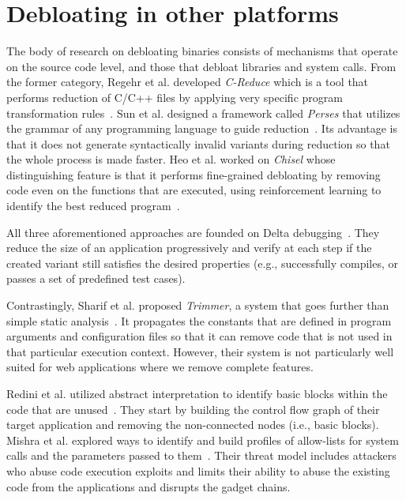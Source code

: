 \section{Debloating in other platforms}

The body of research on debloating binaries consists of mechanisms that operate on the source code level, and those that debloat libraries and system calls. 
From the former category, Regehr et al. developed \textit{C-Reduce} which is a tool that performs reduction of C/C++ files by applying very specific program transformation rules~\cite{regehr2012CReduce}.
Sun et al. designed a framework called \textit{Perses} that utilizes the grammar of any programming language to guide reduction~\cite{sun2018perses}.
Its advantage is that it does not generate syntactically invalid variants during reduction so that the whole process is made faster.
Heo et al. worked on \textit{Chisel} whose distinguishing feature is that it performs fine-grained debloating by removing code even on the functions that are executed, using reinforcement learning to identify the best reduced program~\cite{heo2018effective}.

All three aforementioned approaches are founded on Delta debugging~\cite{zeller2002Delta}.
They reduce the size of an application progressively and verify at each step if the created variant still satisfies the desired properties (e.g., successfully compiles, or passes a set of predefined test cases).

Contrastingly, Sharif et al. proposed \textit{Trimmer}, a system that goes further than simple static analysis~\cite{sharif2018Trimmer}.
It propagates the constants that are defined in program arguments and configuration files so that it can remove code that is not used in that particular execution context.
However, their system is not particularly well suited for web applications where we remove complete features.

Redini et al. utilized abstract interpretation to identify basic blocks within the code that are unused~\cite{redini2019b}. 
They start by building the control flow graph of their target application and removing the non-connected nodes (i.e., basic blocks). 
Mishra et al. explored ways to identify and build profiles of allow-lists for system calls and the parameters passed to them~\cite{mishra2018shredder,mishra2020saffire}. 
Their threat model includes attackers who abuse code execution exploits and limits their ability to abuse the existing code from the applications and disrupts the gadget chains. 

